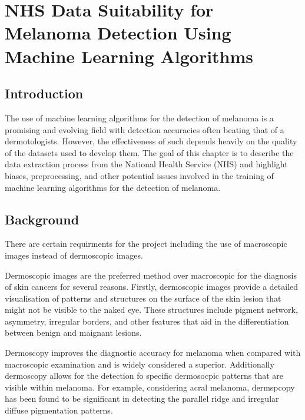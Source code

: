\chapter{NHS Data Suitability for Melanoma Detection Using Machine Learning Algorithms}

\section{Introduction}
The use of machine learning algorithms for the detection of melanoma is a promising and evolving field with detection accuracies often beating that of a dermotologists\cite{Andre2017}. However, the effectiveness of such depends heavily on the quality of the datasets used to develop them. The goal of this chapter is to describe the data extraction process from the National Health Service (NHS) and highlight biases, preprocessing, and other potential issues involved in the training of machine learning algorithms for the detection of melanoma.

\section{Background}

There are certain requirments for the project including the use of macroscopic images instead of dermoscopic images.

Dermoscopic images are the preferred method over macroscopic for the diagnosis of skin cancers for several reasons. Firstly, dermoscopic images provide a detailed visualisation of patterns and structures on the surface of the skin lesion that might not be visible to the naked eye\cite{Vestergaard et al., 2008, Oliveira, R}. These structures include pigment network, asymmetry, irregular borders, and other features that aid in the differentiation between benign and maignant lesions\cite{Vestergaard et al., 2008}. 

Dermoscopy improves the diagnostic accuracy for melanoma when compared with macroscopic examination\cite{Wolner et al., 2017} and is widely considered a superior\cite{Vestergaard et al., 2008}. Additionally dermoscopy allows for the detection fo specific dermosocpic patterns that are visible within melanoma. For example, considering acral melanoma, dermspcopy has been found to be significant in detecting the parallel ridge and irregular diffuse pigmentation patterns\cite{Saida et al., 2004}. 

